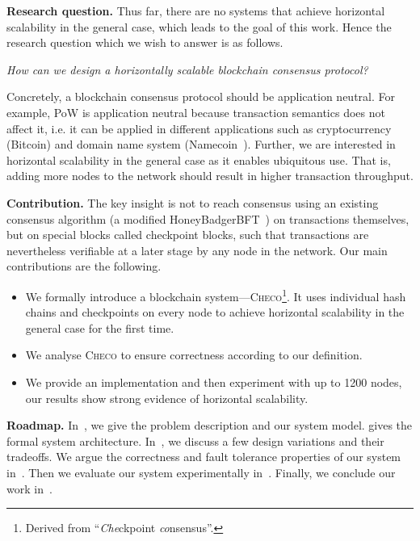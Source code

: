 \textbf{Research question.\quad}
Thus far, there are no systems that achieve horizontal scalability in the general case,
which leads to the goal of this work.
Hence the research question which we wish to answer is as follows.
\begin{displayquote}
    \emph{How can we design a horizontally scalable blockchain consensus protocol?}
    \end{displayquote}
Concretely, a blockchain consensus protocol should be application neutral.
For example, PoW is application neutral because transaction semantics does not affect it,
i.e. it can be applied in different applications such as cryptocurrency (Bitcoin) and domain name system (Namecoin~\cite{namecoin}).
Further, we are interested in horizontal scalability in the general case as it enables ubiquitous use.
That is, adding more nodes to the network should result in higher transaction throughput.

\textbf{Contribution.\quad}
The key insight is not to reach consensus using an existing consensus algorithm (a modified HoneyBadgerBFT~\cite{miller2016honey}) on transactions themselves,
but on special blocks called checkpoint blocks,
such that transactions are nevertheless verifiable at a later stage by any node in the network.
Our main contributions are the following.
\begin{itemize}
    \item We formally introduce a blockchain system---\textsc{Checo}\footnote{Derived from ``\emph{Che}ckpoint \emph{co}nsensus''.}.
        It uses individual hash chains and checkpoints on every node to achieve
        horizontal scalability in the general case for the first time.
    \item We analyse \textsc{Checo} to ensure correctness according to our definition.
    \item We provide an implementation and then experiment with up to 1200 nodes,
        our results show strong evidence of horizontal scalability.
\end{itemize}

\textbf{Roadmap.\quad}
In~,
we give the problem description and our system model.
 gives the formal system architecture.
In~, we discuss a few design variations and their tradeoffs.
We argue the correctness and fault tolerance properties of our system in~.
Then we evaluate our system experimentally in~.
Finally, we conclude our work in~.
